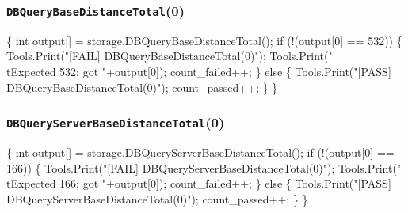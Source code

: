 \documentclass{article}
\def\nwendcode{\endtrivlist \endgroup}
\let\nwdocspar=\par
\begin{document}
\subsubsection{{\tt{}DBQueryBaseDistanceTotal}(0)}
\nwenddocs{}\endmoddef{}
\{
  int output[] = storage.DBQueryBaseDistanceTotal();
  if (!(output[0] == 532)) \{
    Tools.Print("[FAIL] DBQueryBaseDistanceTotal(0)");
    Tools.Print("\\tExpected 532; got "+output[0]);
    count_failed++;
  \} else \{
    Tools.Print("[PASS] DBQueryBaseDistanceTotal(0)");
    count_passed++;
  \}
\}
\nwendcode{}\nwdocspar
\subsubsection{{\tt{}DBQueryServerBaseDistanceTotal}(0)}
\nwenddocs{}\endmoddef{}
\{
  int output[] = storage.DBQueryServerBaseDistanceTotal();
  if (!(output[0] == 166)) \{
    Tools.Print("[FAIL] DBQueryServerBaseDistanceTotal(0)");
    Tools.Print("\\tExpected 166; got "+output[0]);
    count_failed++;
  \} else \{
    Tools.Print("[PASS] DBQueryServerBaseDistanceTotal(0)");
    count_passed++;
  \}
\}
\nwendcode{}\nwdocspar
\end{document}
